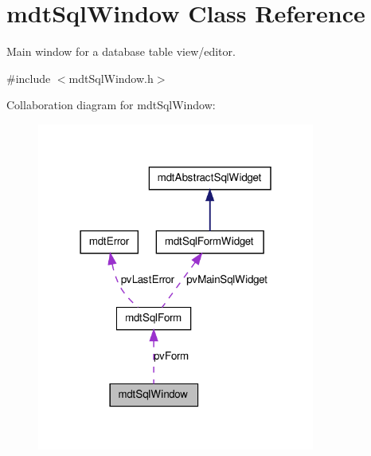 \hypertarget{classmdt_sql_window}{
\section{mdtSqlWindow Class Reference}
\label{classmdt_sql_window}
}


Main window for a database table view/editor.  




{\ttfamily \#include $<$mdtSqlWindow.h$>$}



Collaboration diagram for mdtSqlWindow:
\nopagebreak
\begin{figure}[H]
\begin{center}
\leavevmode
\includegraphics[width=259pt]{classmdt_sql_window__coll__graph}
\end{center}
\end{figure}
